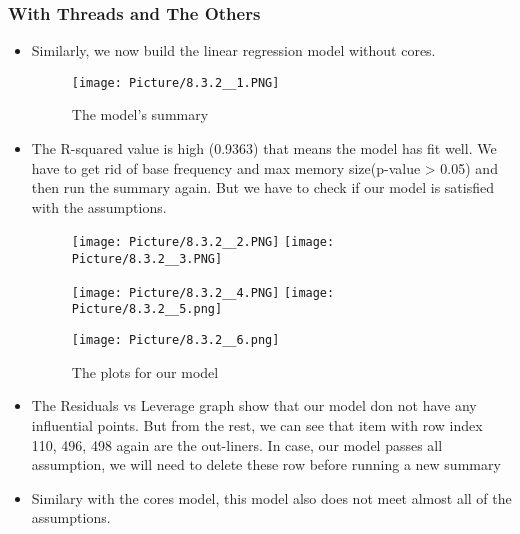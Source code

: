 \documentclass[a4paper]{article}
\begin{document}
\subsubsection{With Threads and The Others}
\begin{itemize}
    \item[]Similarly, we now build the linear regression model without cores.
    
     \begin{figure}[H]
        \centering
        \texttt{[image: Picture/8.3.2\_\_1.PNG]}
        \caption{The model's summary}
        \label{8.3.2.1}
    \end{figure}
    
     \item[] The R-squared value is high (0.9363) that means the model has fit well. We have to get rid of base frequency and max memory size(p-value > 0.05) and then run the summary again. But we have to check if our model is satisfied with the assumptions.
    
     \begin{figure}[H]
        \centering
        \texttt{[image: Picture/8.3.2\_\_2.PNG]}
        \texttt{[image: Picture/8.3.2\_\_3.PNG]}
        \label{8.3.2.2}
    \end{figure}
    
    \begin{figure}[H]
        \centering
        \texttt{[image: Picture/8.3.2\_\_4.PNG]}
        \texttt{[image: Picture/8.3.2\_\_5.png]}
        \label{8.3.3.3}
    \end{figure}
    
     \begin{figure}[H]
        \centering
        \texttt{[image: Picture/8.3.2\_\_6.png]}
        \caption{The plots for our model}
        \label{8.3.4.4}
    \end{figure}
    
    \item[]The Residuals vs Leverage graph show that our model don not have any influential points. But from the rest, we can see that item with row index 110, 496, 498 again are the out-liners. In case, our model passes all assumption, we will need to delete these row before running a new summary
    
    \item[] Similary with the cores model, this model also does not meet almost all of the assumptions.
    

\end{itemize}
\end{document}
